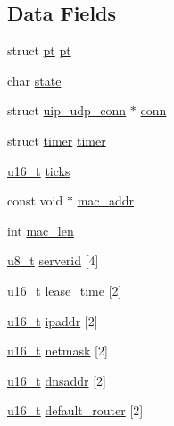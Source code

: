 \subsection*{Data Fields}
\begin{DoxyCompactItemize}
\item 
struct \hyperlink{structpt}{pt} \hyperlink{structdhcpc__state_a31471b5e27bda51832d0fa49bd6d9b54}{pt}
\item 
char \hyperlink{structdhcpc__state_ae0b137a3875ad12a99e5e3e0e177fd12}{state}
\item 
struct \hyperlink{structuip__udp__conn}{uip\_\-udp\_\-conn} $\ast$ \hyperlink{structdhcpc__state_acfd36e02c7498d766ff802575e981612}{conn}
\item 
struct \hyperlink{structtimer}{timer} \hyperlink{structdhcpc__state_ae80af46ceef63eab3c786525370ae720}{timer}
\item 
\hyperlink{group__uipfw_ga77570ac4fcab86864fa1916e55676da2}{u16\_\-t} \hyperlink{structdhcpc__state_ae707c39412e09d3a47f0b3c5dad33725}{ticks}
\item 
const void $\ast$ \hyperlink{structdhcpc__state_a2391bb18db5f620e0e9fb848ae5ba5e9}{mac\_\-addr}
\item 
int \hyperlink{structdhcpc__state_a5361ef75bfbdb469b5cc31f0060a2670}{mac\_\-len}
\item 
\hyperlink{group__uipfw_ga4caecabca98b43919dd11be1c0d4cd8e}{u8\_\-t} \hyperlink{structdhcpc__state_a564bab93ef6a268a5de2fab885c1d32a}{serverid} \mbox{[}4\mbox{]}
\item 
\hyperlink{group__uipfw_ga77570ac4fcab86864fa1916e55676da2}{u16\_\-t} \hyperlink{structdhcpc__state_a7a520a57d7d0541524f34a7685635597}{lease\_\-time} \mbox{[}2\mbox{]}
\item 
\hyperlink{group__uipfw_ga77570ac4fcab86864fa1916e55676da2}{u16\_\-t} \hyperlink{structdhcpc__state_a1d2f2751b0865045486c9aa59d0d0971}{ipaddr} \mbox{[}2\mbox{]}
\item 
\hyperlink{group__uipfw_ga77570ac4fcab86864fa1916e55676da2}{u16\_\-t} \hyperlink{structdhcpc__state_a20541305548441e5dcb2e1e7e6f300eb}{netmask} \mbox{[}2\mbox{]}
\item 
\hyperlink{group__uipfw_ga77570ac4fcab86864fa1916e55676da2}{u16\_\-t} \hyperlink{structdhcpc__state_a27df2817055bc099821d96eb60a40b34}{dnsaddr} \mbox{[}2\mbox{]}
\item 
\hyperlink{group__uipfw_ga77570ac4fcab86864fa1916e55676da2}{u16\_\-t} \hyperlink{structdhcpc__state_a5e16ca335dfd7394527f602da879fca2}{default\_\-router} \mbox{[}2\mbox{]}
\end{DoxyCompactItemize}


